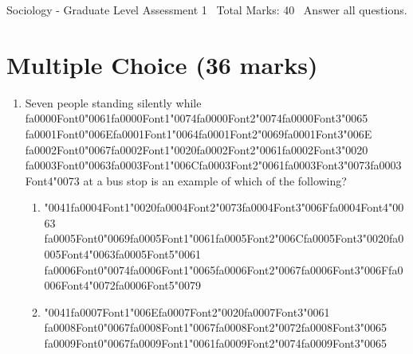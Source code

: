 \documentclass[12pt]{article}
\begin{document}
\begin{center}
Sociology - Graduate Level Assessment 1 \
Total Marks: 40 \
Answer all questions.
\end{center}

\section*{Multiple Choice (36 marks)}
\begin{enumerate}[label=\arabic*.]
\item Seven people standing silently while {\csname fa0000Font0\endcsname\char"0061}{\csname fa0000Font1\endcsname\char"0074}{\csname fa0000Font2\endcsname\char"0074}{\csname fa0000Font3\endcsname\char"0065} {\csname fa0001Font0\endcsname\char"006E}{\csname fa0001Font1\endcsname\char"0064}{\csname fa0001Font2\endcsname\char"0069}{\csname fa0001Font3\endcsname\char"006E} {\csname fa0002Font0\endcsname\char"0067}{\csname fa0002Font1\endcsname\char"0020}{\csname fa0002Font2\endcsname\char"0061}{\csname fa0002Font3\endcsname\char"0020} {\csname fa0003Font0\endcsname\char"0063}{\csname fa0003Font1\endcsname\char"006C}{\csname fa0003Font2\endcsname\char"0061}{\csname fa0003Font3\endcsname\char"0073}{\csname fa0003Font4\endcsname\char"0073} at a bus stop is an example of which of the following?
\begin{enumerate}[label=(\alph*)]
    \item {\char"0041}{\csname fa0004Font1\endcsname\char"0020}{\csname fa0004Font2\endcsname\char"0073}{\csname fa0004Font3\endcsname\char"006F}{\csname fa0004Font4\endcsname\char"0063} {\csname fa0005Font0\endcsname\char"0069}{\csname fa0005Font1\endcsname\char"0061}{\csname fa0005Font2\endcsname\char"006C}{\csname fa0005Font3\endcsname\char"0020}{\csname fa0005Font4\endcsname\char"0063}{\csname fa0005Font5\endcsname\char"0061} {\csname fa0006Font0\endcsname\char"0074}{\csname fa0006Font1\endcsname\char"0065}{\csname fa0006Font2\endcsname\char"0067}{\csname fa0006Font3\endcsname\char"006F}{\csname fa0006Font4\endcsname\char"0072}{\csname fa0006Font5\endcsname\char"0079}
    \item {\char"0041}{\csname fa0007Font1\endcsname\char"006E}{\csname fa0007Font2\endcsname\char"0020}{\csname fa0007Font3\endcsname\char"0061} {\csname fa0008Font0\endcsname\char"0067}{\csname fa0008Font1\endcsname\char"0067}{\csname fa0008Font2\endcsname\char"0072}{\csname fa0008Font3\endcsname\char"0065} {\csname fa0009Font0\endcsname\char"0067}{\csname fa0009Font1\endcsname\char"0061}{\csname fa0009Font2\endcsname\char"0074}{\csname fa0009Font3\endcsname\char"0065}

\end{enumerate}
\end{enumerate}
\end{document}
